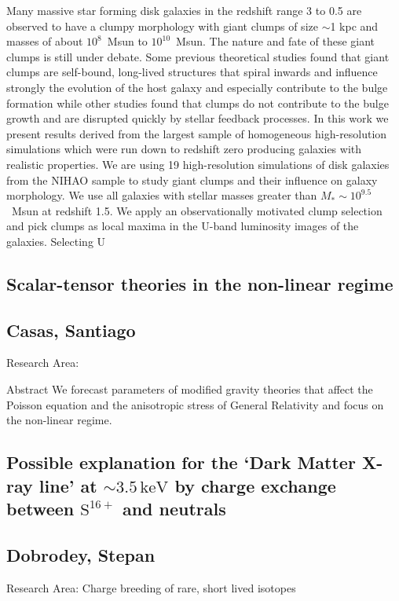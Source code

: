 \noindent Many massive star forming disk galaxies in the redshift range 3 to 0.5 are observed to have a clumpy morphology with giant clumps of size $\sim$1 kpc and masses of about $10^8$~Msun to $10^{10}$~Msun. The nature and fate of these giant clumps is still under debate. Some previous theoretical studies found that giant clumps are self-bound, long-lived structures that spiral inwards and influence strongly the evolution of the host galaxy and especially contribute to the bulge formation while other studies found that clumps do not contribute to the bulge growth and are disrupted quickly by stellar feedback processes. In this work we present results derived from the largest sample of homogeneous high-resolution simulations which were run down to redshift zero producing galaxies with realistic properties. We are using 19 high-resolution simulations of disk galaxies from the NIHAO sample to study giant clumps and their influence on galaxy morphology. We use all galaxies with stellar masses greater than $M_{*}\sim10^{9.5}$~Msun at redshift 1.5. We apply an observationally motivated clump selection and pick clumps as local maxima in the U-band luminosity images of the galaxies. Selecting U
\newpage
\subsection*{\centering \large Scalar-tensor theories in the non-linear regime}
\subsection*{\centering \normalsize Casas, Santiago}
Research Area: \newline

\noindent Abstract We forecast parameters of modified gravity theories that affect the Poisson equation and the anisotropic stress of General Relativity and focus on the non-linear regime.

\newpage
\subsection*{\centering \large Possible explanation for the `Dark Matter X-ray line' at $\sim 3.5\,\mathrm{keV}$ by
charge exchange between  $\mathrm{S}^{16+}$ and neutrals}
\subsection*{\centering \normalsize Dobrodey, Stepan}
Research Area: Charge breeding of rare, short lived isotopes\newline

